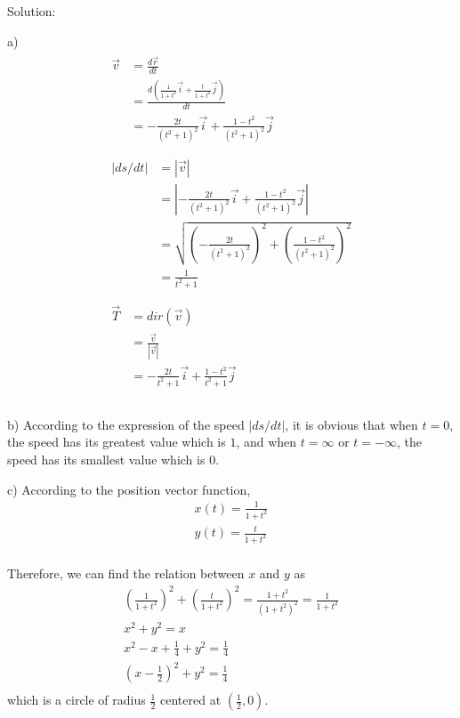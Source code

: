 \documentclass{article}
\begin{document}
Solution:

a) 
\begin{gather*}
  \begin{split}
    \vec{v} &= \frac{d\vec{r}}{dt} \\
            &= \frac{d(\frac{1}{1 + t^2} \vec{i} + \frac{t}{1 + t^2} \vec{j})}{dt} \\
            &= -\frac{2t}{(t^2 + 1)^2} \vec{i} + \frac{1 - t^2}{(t^2 + 1)^2} \vec{j} \\
  \end{split} \\
  \begin{split}
    |ds/dt| &= |\vec{v}| \\
            &= |-\frac{2t}{(t^2 + 1)^2} \vec{i} + \frac{1 - t^2}{(t^2 + 1)^2} \vec{j}| \\
            &= \sqrt{(-\frac{2t}{(t^2 + 1)^2})^2 + (\frac{1 - t^2}{(t^2 + 1)^2})^2} \\
            &= \frac{1}{t^2 + 1} \\
  \end{split} \\
  \begin{split}
    \vec{T} &= dir(\vec{v}) \\
            &= \frac{\vec{v}}{|\vec{v}|} \\
            &= -\frac{2t}{t^2 + 1} \vec{i} + \frac{1 - t^2}{t^2 + 1} \vec{j} \\
  \end{split} \\
\end{gather*}

b) According to the expression of the speed $|ds/dt|$, it is obvious that when 
$t = 0$, the speed has its greatest value which is $1$, and when $t = \infty$ or 
$t = -\infty$, the speed has its smallest value which is $0$.

c) According to the position vector function,
\begin{gather*}
  x(t) = \frac{1}{1 + t^2} \\
  y(t) = \frac{t}{1 + t^2} \\
\end{gather*}

Therefore, we can find the relation between $x$ and $y$ as
\begin{gather*}
  (\frac{1}{1 + t^2})^2 + (\frac{t}{1 + t^2})^2 = \frac{1 + t^2}{(1 + t^2)^2} = \frac{1}{1 + t^2} \\
  x^2 + y^2 = x \\
  x^2 - x + \frac{1}{4} + y^2 = \frac{1}{4} \\
  (x - \frac{1}{2})^2 + y^2 = \frac{1}{4} \\
\end{gather*}
which is a circle of radius $\frac{1}{2}$ centered at $(\frac{1}{2}, 0)$.
\end{document}
